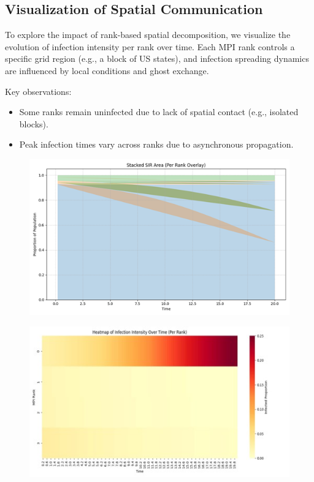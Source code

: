 \subsection{Visualization of Spatial Communication}
To explore the impact of rank-based spatial decomposition, we visualize the evolution of infection intensity per rank over time. Each MPI rank controls a specific grid region (e.g., a block of US states), and infection spreading dynamics are influenced by local conditions and ghost exchange.

Key observations:
\begin{itemize}
    \item Some ranks remain uninfected due to lack of spatial contact (e.g., isolated blocks).
    \item Peak infection times vary across ranks due to asynchronous propagation.
\end{itemize}
\begin{figure}[!htb]
    \centering
    \includegraphics[width=14cm]{Images/pic3.png}
    
\end{figure}\begin{figure}[!htb]
    \centering
    \includegraphics[width=14cm]{Images/pic2.jpg}
\end{figure}
